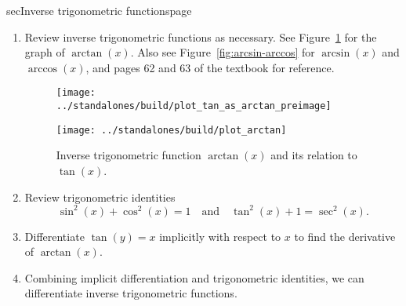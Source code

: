 \documentclass[../main]{subfiles}
\begin{document}
\begin{outline}{sec}{Inverse trigonometric functions}{page} \label{act:inverse_trigs}
  \begin{enumerate}
    \item Review inverse trigonometric functions as necessary. See Figure~\ref{fig:arctan} for the graph of \(\arctan(x)\). Also see Figure~\ref{fig:arcsin-arccos} for \(\arcsin(x)\) and \(\arccos(x)\), and pages 62 and 63 of the textbook for reference.
      
      \begin{figure}[h]
        \centering
        \begin{minipage}{.45\textwidth}
          \texttt{[image: ../standalones/build/plot\_tan\_as\_arctan\_preimage]}
        \end{minipage}
        \quad
        \begin{minipage}{.45\textwidth}
          \texttt{[image: ../standalones/build/plot\_arctan]}
        \end{minipage}

        \caption{Inverse trigonometric function \(\arctan(x)\) and its relation to \(\tan(x)\).}
        \label{fig:arctan}
      \end{figure}
    \item Review trigonometric identities
      \[
        \sin^{2}(x) + \cos^{2}(x) = 1 \quad\text{and}\quad \tan^{2}(x) + 1 = \sec^{2}(x).
      \]
      
    \item Differentiate \(\tan(y) = x\) implicitly with respect to \(x\) to find the derivative of \(\arctan(x)\).
    \item {Combining implicit differentiation and trigonometric identities, we can differentiate inverse trigonometric functions.}
\end{enumerate}
\end{outline}
\end{document}
